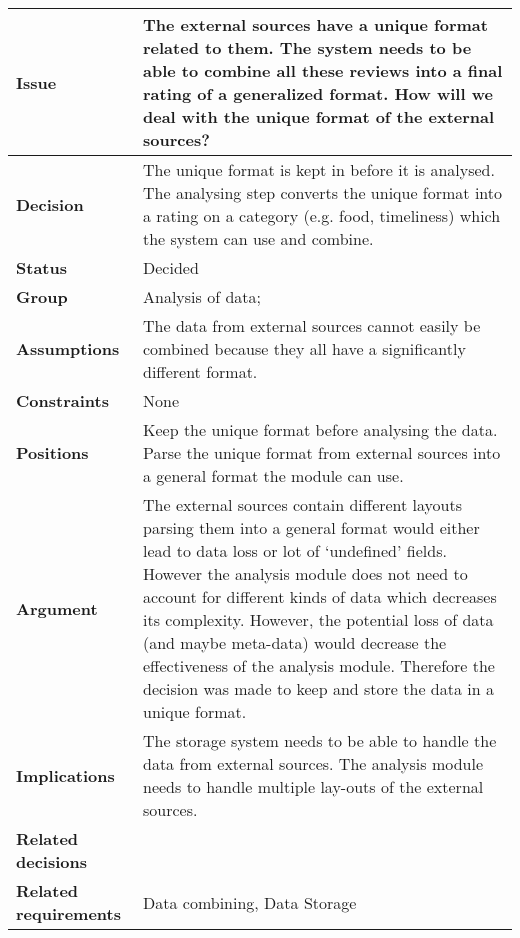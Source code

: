

{\large{}}
\label{dd:data-format}
\begin{tabular}{ l  p{10cm}}
\hline
\bf Issue & The external sources have a unique format related to them. The system needs to be able to combine all these reviews into a final rating of a generalized format. How will we deal with the unique format of the external sources? \\
\hline
\bf Decision & The unique format is kept in before it is analysed. The analysing step converts the unique format into a rating on a category (e.g. food, timeliness) which the system can use and combine. \\
\hline
\bf Status & Decided \\
\hline
\bf Group & Analysis of data; \\
\hline
\bf Assumptions & The data from external sources cannot easily be combined because they all have a significantly different format. \\
\hline
\bf Constraints & None \\
\hline
\bf Positions & Keep the unique format before analysing the data. \newline\newline
Parse the unique format from external sources into a general format the  module can use. \\
\hline
\bf Argument & The external sources contain different layouts parsing them into a general format would either lead to data loss or lot of ‘undefined’ fields. However the analysis module does not need to account for different kinds of data which decreases its complexity. However, the potential loss of data (and maybe meta-data) would decrease the effectiveness of the analysis module. Therefore the decision was made to keep and store the data in a unique format. \\
\hline
\bf Implications & The storage system needs to be able to handle the data from external sources. The analysis module needs to handle multiple lay-outs of the external sources. \\
\hline
\bf Related decisions & \\
\hline
\bf Related requirements & Data combining, Data Storage \\
\hline
\end{tabular}
